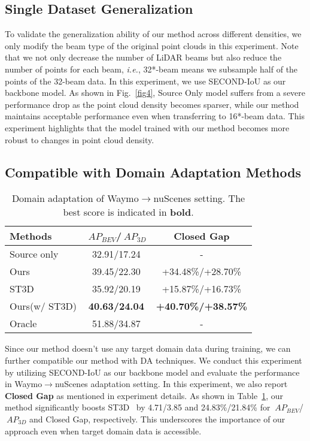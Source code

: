 \subsection{Single Dataset Generalization}
To validate the generalization ability of our method across different densities, we only modify the beam type of the original point clouds in this experiment. Note that we not only decrease the number of LiDAR beams but also reduce the number of points for each beam, \emph{i.e.}, 32*-beam means we subsample half of the points of the 32-beam data. In this experiment, we use SECOND-IoU as our backbone model. As shown in Fig.~\ref{fig4}, Source Only model suffers from a severe performance drop as the point cloud density becomes sparser, while our method maintains acceptable performance even when transferring to 16*-beam data. This experiment highlights that the model trained with our method becomes more robust to changes in point cloud density.


\subsection{Compatible with Domain Adaptation Methods}
\begin{table}[t!]
    \centering
    \caption{Domain adaptation of Waymo$\rightarrow$nuScenes setting. The best score is indicated in \textbf{bold}.}
    \begin{tabular}{l | c | c}
    \toprule[1.5pt]
         Methods & $\SI{}{AP_{BEV}}$/$\SI{}{AP_{3D}}$ & Closed Gap \\ \hline
         Source only & 32.91/17.24 & - \\
         Ours & 39.45/22.30 & +34.48\%/+28.70\% \\ \hline
         ST3D & 35.92/20.19 & +15.87\%/+16.73\% \\
         Ours(w/ ST3D) & \textbf{40.63/24.04} & \textbf{+40.70\%/+38.57\%} \\ \hline
         Oracle & 51.88/34.87 & - \\

    \bottomrule[1.5pt]
    \end{tabular}
    \label{tab:With_DA}
\end{table}

Since our method doesn't use any target domain data during training, we can further compatible our method with DA techniques. We conduct this experiment by utilizing SECOND-IoU as our backbone model and evaluate the performance in Waymo$\rightarrow$nuScenes adaptation setting. In this experiment, we also report \textbf{Closed Gap} as mentioned in experiment details. As shown in Table~\ref{tab:With_DA}, our method significantly boosts ST3D~\cite{yang2021st3d} by 4.71/3.85 and 24.83\%/21.84\% for $\SI{}{AP_{BEV}}$/$\SI{}{AP_{3D}}$ and Closed Gap, respectively. This underscores the importance of our approach even when target domain data is accessible.